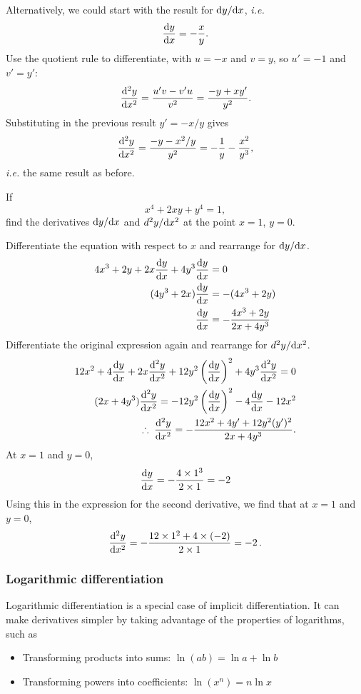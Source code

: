 Alternatively, we could start with the result for ${\rm d}y/{\rm d}x$, \emph{i.e.}
\[
\frac{{\rm d} y}{{\rm d} x}=-\frac{x}{y}.
\]
Use the quotient rule to differentiate, with $u=-x$ and $v=y$, so $u'=-1$ and $v'=y'$:
\[
\frac{{\rm d} ^2y}{{\rm d} x^2}=\frac{u'v-v'u}{v^2}=\frac{-y+xy'}{y^2}.
\]
Substituting in the previous result $y'=-x/y$ gives
\[
\frac{{\rm d} ^2y}{{\rm d} x^2}=\frac{-y-x^2/y}{y^2}=-\frac{1}{y}-\frac{x^2}{y^3},
\]
\emph{i.e.} the same result as before.

\goodbreak
\begin{example}[Lecture]
If
\[
x^4+2xy+y^4=1,
\]
find the derivatives ${\rm d}y/{\rm d}x$ and $d^2y/{\rm d}x^2$ at the point $x=1$, $y=0$.
\end{example}
%
\begin{solution}
Differentiate the equation with respect to $x$ and rearrange for ${\rm d}y/{\rm d}x$.
\begin{align*}
4x^3 + 2y + 2x\frac{{\rm d} y}{{\rm d} x} + 4y^3\frac{{\rm d} y}{{\rm d} x}&=0\\
(4y^3+2x)\frac{{\rm d} y}{{\rm d} x} &= -(4x^3 + 2y)\\
\frac{{\rm d} y}{{\rm d} x}&=-\frac{4x^3+2y}{2x+4y^3}
\end{align*}
Differentiate the original expression again and rearrange for $d^2y/{\rm d}x^2$.
\begin{align*}
12x^2 + 4\frac{{\rm d} y}{{\rm d} x} + 2x\frac{{\rm d} ^2y}{{\rm d} x^2} + 12y^2\left(\frac{{\rm d} y}{{\rm d} x}\right)^2 + 4y^3\frac{{\rm d} ^2y}{{\rm d} x^2} = 0\\
(2x+4y^3)\frac{{\rm d} ^2y}{{\rm d} x^2} = -12y^2\left(\frac{{\rm d} y}{{\rm d} x}\right)^2 - 4\frac{{\rm d} y}{{\rm d} x} - 12x^2\\
\therefore \; \frac{{\rm d} ^2y}{{\rm d} x^2}=-\frac{12x^2+4y'+12y^2(y')^2}{2x+4y^3}.
\end{align*}
At $x=1$ and $y=0$,
\[
\frac{{\rm d} y}{{\rm d} x}=-\frac{4\times 1^3}{2\times 1} = -2
\]
Using this in the expression for the second derivative, we find that at $x=1$ and $y=0$,
\[
\frac{{\rm d} ^2y}{{\rm d} x^2}=-\frac{12\times1^2+ 4\times(-2)}{2\times 1} = -2\,.
\]
\end{solution}

\subsubsection{Logarithmic differentiation}

Logarithmic differentiation is a special case of implicit differentiation. It can make derivatives simpler by taking advantage of the properties of logarithms, such as
\begin{itemize}
\item Transforming products into sums: $\ln(ab)=\ln a+\ln b$
\item Transforming powers into coefficients: $\ln(x^n)=n\ln x$
\end{itemize}

